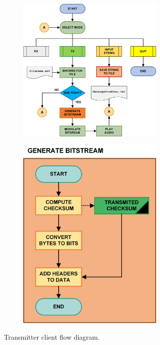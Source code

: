 \documentclass[12pt,a4paper,openright]{report}
\begin{document}
 \begin{figure}[H]
 \centering
 \begin{subfigure}[t]{.7\textwidth}
 \centering
    \includegraphics[width=0.8\textwidth]{TXschem.png}
    \label{fig:TXclientFull}
    \end{subfigure}%
 \begin{subfigure}[t]{.3\textwidth}
  	 \centering
      \includegraphics[width=0.8\textwidth]{schemGenBS.png}
      \label{fig:TXclientRecFile}
   \end{subfigure}
    \caption[Transmitter client flow diagram]{Transmitter client flow diagram.}
     \label{fig:TXclient}
 \end{figure} 
\end{document}
